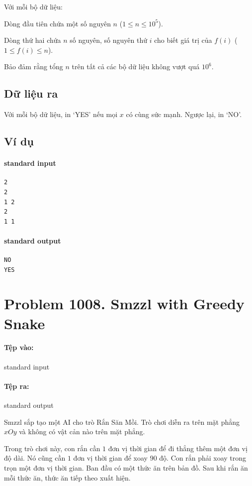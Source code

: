 \documentclass[11pt]{article}
\begin{document}
Với mỗi bộ dữ liệu:

Dòng đầu tiên chứa một số nguyên \(n\) (\(1\le n\le 10^5\)).

Dòng thứ hai chứa \(n\) số nguyên, số nguyên thứ \(i\) cho biết giá trị của
\(f(i)\) (\(1\le f(i)\le n\)).

Bảo đảm rằng tổng \(n\) trên tất cả các bộ dữ liệu không vượt quá \(10^6\).

\subsection*{Dữ liệu ra}

Với mỗi bộ dữ liệu, in `YES' nếu mọi \(x\) có cùng sức mạnh. Ngược lại, in
`NO'.

\subsection*{Ví dụ}

\paragraph{standard input}
\begin{verbatim}
2
2
1 2
2
1 1
\end{verbatim}

\paragraph{standard output}
\begin{verbatim}
NO
YES
\end{verbatim}

\section{Problem 1008. Smzzl with Greedy Snake}

\paragraph{Tệp vào:} standard input
\paragraph{Tệp ra:} standard output

Smzzl sắp tạo một AI cho trò Rắn Săn Mồi. Trò chơi diễn ra trên mặt phẳng
\(xOy\) và không có vật cản nào trên mặt phẳng.

Trong trò chơi này, con rắn cần \(1\) đơn vị thời gian để đi thẳng thêm một
đơn vị độ dài. Nó cũng cần \(1\) đơn vị thời gian để xoay \(90\) độ. Con rắn
phải xoay trong trọn một đơn vị thời gian. Ban đầu có một thức ăn trên bản đồ.
Sau khi rắn ăn mỗi thức ăn, thức ăn tiếp theo xuất hiện.
\end{document}

